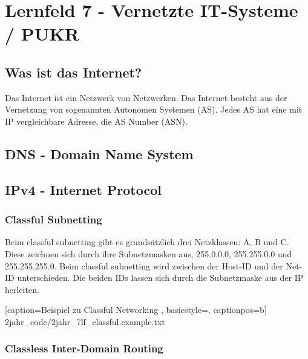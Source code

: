\section{Lernfeld 7 - Vernetzte IT-Systeme / PUKR} %

\subsection{Was ist das Internet?}

Das Internet ist ein Netzwerk von Netzwerken. Das Internet besteht aus der Vernetzung von sogenannten Autonomen Systemen (AS). Jedes AS hat eine mit IP vergleichbare Adresse, die AS Number (ASN).


\subsection{DNS - Domain Name System}


\subsection{IPv4 - Internet Protocol}

\subsubsection{Classful Subnetting}

Beim classful subnetting gibt es grundsätzlich drei Netzklassen: A, B und C. Diese zeichnen sich durch ihre Subnetzmasken aus, 255.0.0.0, 255.255.0.0 und 255.255.255.0. Beim classful subnetting wird zwischen der Host-ID und der Net-ID unterschieden. Die beiden IDs lassen sich durch die Subnetzmaske aus der IP herleiten.


	[caption={Beispiel zu Classful Networking}
	\label{lst:7lf_classful.example},
	basicstyle=\small,
	captionpos=b]
	{2jahr_code/2jahr_7lf_classful.example.txt}

\subsubsection{Classless Inter-Domain Routing}

